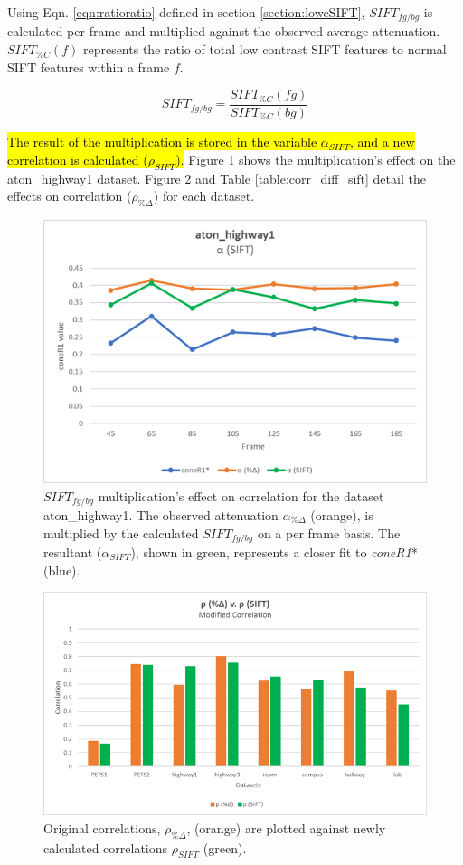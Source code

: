 Using Eqn. \ref{eqn:ratioratio} defined in section \ref{section:lowcSIFT}, $SIFT_{fg/bg}$ is calculated per frame and multiplied against the observed average attenuation. $SIFT_{\%C}(f)$ represents the ratio of total low contrast SIFT features to normal SIFT features within a frame $f$.

\begin{equation}
SIFT_{fg/bg} = \dfrac{SIFT_{\%C}(fg)}{SIFT_{\%C}(bg)}
\end{equation}

 \hl{The result of the multiplication is stored in the variable $\alpha_{SIFT}$, and a new correlation is calculated ($\rho_{SIFT}$).} Figure \ref{fig:highway1_sift} shows the multiplication's effect on the aton\_highway1 dataset. Figure \ref{fig:corr_diff_sift} and Table \ref{table:corr_diff_sift} detail the effects on correlation ($\rho_{\%\Delta}$) for each dataset.

\begin{figure}
  \centering
  \includegraphics[width=.8\linewidth]{figures/highway1_sift.jpg}
\caption{$SIFT_{fg/bg}$ multiplication's effect on correlation for the dataset aton\_highway1. The observed attenuation $\alpha_{\%\Delta}$ (orange), is multiplied by the calculated $SIFT_{fg/bg}$ on a per frame basis. The resultant ($\alpha_{SIFT}$), shown in green, represents a closer fit to \textit{coneR1}* (blue).}
\label{fig:highway1_sift}
\end{figure}

\begin{figure}
  \includegraphics[width=1\linewidth]{figures/sift_correlation_diff.jpg}
\caption{Original correlations, $\rho_{\%\Delta}$, (orange) are plotted against newly calculated correlations $\rho_{SIFT}$ (green).}
\label{fig:corr_diff_sift}
\end{figure}

